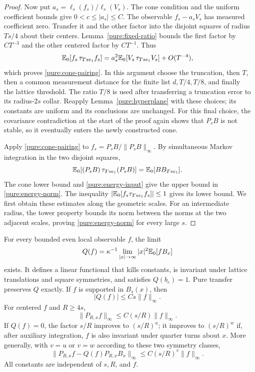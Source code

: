 \begin{proof}
Now put $a_s=\ell_s(f_s)/\ell_s(V_s)$.  The cone condition and the uniform
coefficient bounds give $0<c\leq|a_s|\leq C$.  The observable
$f_s-a_sV_s$ has measured coefficient zero.  Transfer it and the other
factor into the disjoint squares of radius $Ts/4$ about their centers.
Lemma~\ref{pure:fixed-ratio} bounds the first factor by $CT^{-3}$ and
the other centered factor by $CT^{-1}$.  Thus
\[
 \mathbb E_0[f_s\,\tau_{Ts e_1}f_s]
   =a_s^2\mathbb E_0[V_s\,\tau_{Ts e_1}V_s]+O(T^{-4}),
\]
which proves \eqref{pure:cone-pairing}.  In this argument choose the
truncation, then $T$, then a common measurement distance for the finite
list $d,T/4,T/8$, and finally the lattice threshold.  The ratio $T/8$
is used after transferring a truncation error to its radius-$2s$ collar.
Reapply Lemma~\ref{pure:hyperplane} with these choices; its constants are
uniform and its conclusions are unchanged.  For this final choice, the
covariance contradiction at the start of the proof again shows that
$P_sB$ is not stable, so it eventually enters the newly constructed cone.

Apply \eqref{pure:cone-pairing} to
$f_s=P_sB/\|P_sB\|_\infty$.  By simultaneous Markov integration in the
two disjoint squares,
\[
 \mathbb E_0[(P_sB)\,\tau_{Ts e_1}(P_sB)]
       =\mathbb E_0[B B_{Ts e_1}].
\]
The cone lower bound and \eqref{pure:energy-input} give the upper bound
in \eqref{pure:energy-norm}.  The inequality
$|\mathbb E_0[f_s\tau_{Ts e_1}f_s]|\leq1$ gives its lower bound.  We first
obtain these estimates along the geometric scales.  For an intermediate
radius, the tower property bounds its norm between the norms at the two
adjacent scales, proving \eqref{pure:energy-norm} for every large $s$.
\end{proof}

\begin{theorem}
\label{pure:charge}
For every bounded even local observable $f$, the limit
\begin{equation}
 Q(f)=\kappa^{-1}\lim_{|x|\to\infty}|x|^2\mathbb E_0[fB_x]
 \label{pure:charge-definition}
\end{equation}
exists.  It defines a linear functional that kills constants, is invariant
under lattice translations and square symmetries, and satisfies $Q(b_e)=1$.
Pure transfer preserves $Q$ exactly.  If $f$ is supported in $B_s(x)$,
then
\begin{equation}
 |Q(f)|\leq Cs\|f\|_\infty.
 \label{pure:charge-bound}
\end{equation}
For centered $f$ and $R\geq4s$,
\begin{equation}
 \|P_{R,x}f\|_\infty\leq C(s/R)\|f\|_\infty.
 \label{pure:even-transfer}
\end{equation}
If $Q(f)=0$, the factor $s/R$ improves to $(s/R)^u$; it improves to
$(s/R)^w$ if, after auxiliary integration, $f$ is also invariant under
quarter turns about $x$.  More generally, with $v=u$ or $v=w$ according
to these two symmetry classes,
\begin{equation}
 \|P_{R,x}f-Q(f)P_{R,x}B_x\|_\infty
      \leq C(s/R)^v\|f\|_\infty.
 \label{pure:energy-remainder}
\end{equation}
All constants are independent of $s,R$, and $f$.
\end{theorem}


